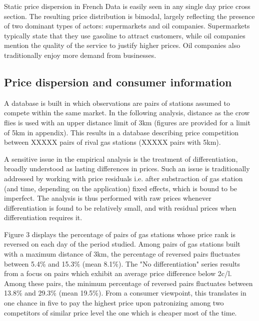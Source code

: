 \documentclass[english]{article}
\begin{document}
Static price dispersion in French Data is easily seen in any single day price cross section. The resulting price distribution is bimodal, largely reflecting the presence of two dominant types of actors: supermarkets and oil companies. Supermarkets typically state that they use gasoline to attract customers, while oil companies mention the quality of the service to justify higher prices. Oil companies also traditionally enjoy more demand from businesses.

\subsection{Price dispersion and consumer information}

A database is built in which observations are pairs of stations assumed to compete within the same market. In the following analysis, distance as the crow flies is used with an upper distance limit of 3km (figures are provided for a limit of 5km in appendix). This results in a database describing price competition between XXXXX pairs of rival gas stations (XXXXX pairs with 5km).

A sensitive issue in the empirical analysis is the treatment of differentiation, broadly understood as lasting differences in prices. Such an issue is traditionally addressed by working with price residuals i.e. after substraction of gas station (and time, depending on the application) fixed effects, which is bound to be imperfect. The analysis is thus performed with raw prices whenever differentiation is found to be relatively small, and with residual prices when differentiation requires it.

Figure 3 displays the percentage of pairs of gas stations whose price rank is reversed on each day of the period studied. Among pairs of gas stations built with a maximum distance of 3km, the percentage of reversed pairs fluctuates between 5.4\% and 15.3\%  (mean 8.1\%). The "No differentiation" series results from a focus on pairs which exhibit an average price difference below 2c/l. Among these pairs, the minimum percentage of reversed pairs fluctuates between 13.8\% and 29.3\% (mean 19.5\%). From a consumer viewpoint, this translates in one chance in five to pay the highest price upon patronizing among two competitors of similar price level the one which is cheaper most of the time.
\end{document}
